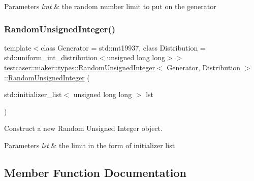 \begin{DoxyParams}{Parameters}
{\em lmt} & the random number limit to put on the generator \\
\hline
\end{DoxyParams}
\mbox{\label{classtestcaser_1_1maker_1_1types_1_1RandomUnsignedInteger_a485a3c55c963dbfd1fca8b62214f78ad}} 
\subsubsection{\texorpdfstring{Random\+Unsigned\+Integer()}{RandomUnsignedInteger()}\hspace{0.1cm}{\footnotesize\ttfamily [2/2]}}
{\footnotesize\ttfamily template$<$class Generator = std\+::mt19937, class Distribution = std\+::uniform\+\_\+int\+\_\+distribution$<$unsigned long long$>$$>$ \\
\hyperlink{classtestcaser_1_1maker_1_1types_1_1RandomUnsignedInteger}{testcaser\+::maker\+::types\+::\+Random\+Unsigned\+Integer}$<$ Generator, Distribution $>$\+::\hyperlink{classtestcaser_1_1maker_1_1types_1_1RandomUnsignedInteger}{Random\+Unsigned\+Integer} (\begin{DoxyParamCaption}\item[{std\+::initializer\+\_\+list$<$ unsigned long long $>$}]{lst }\end{DoxyParamCaption})\hspace{0.3cm}{\ttfamily [inline]}}



Construct a new Random Unsigned Integer object. 


\begin{DoxyParams}{Parameters}
{\em lst} & the limit in the form of initializer list \\
\hline
\end{DoxyParams}


\subsection{Member Function Documentation}
\mbox{\label{classtestcaser_1_1maker_1_1types_1_1RandomUnsignedInteger_a73504939f740445d56b0bd00257f5480}} 
